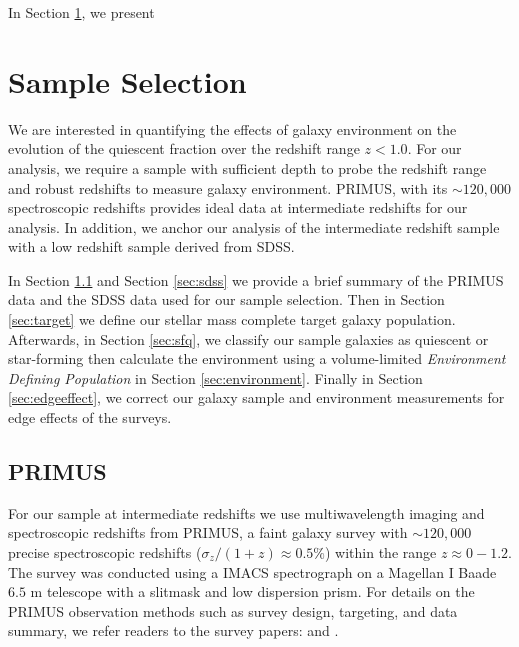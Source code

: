 \documentclass{emulateapj}
\begin{document}
In Section \ref{sec:sample}, we present 

\section{Sample Selection} \label{sec:sample}
We are interested in quantifying the effects of galaxy environment on the evolution of the quiescent fraction over the redshift range $ z < 1.0$. For our analysis, we require a sample with sufficient depth to probe the redshift range and robust redshifts to measure galaxy environment. PRIMUS, with its $\sim 120,000$ spectroscopic redshifts provides ideal data at intermediate redshifts for our analysis. In addition, we anchor our analysis of the intermediate redshift sample with a low redshift sample derived from SDSS. 

In Section \ref{sec:primus} and Section \ref{sec:sdss} we provide a brief summary of the PRIMUS data and the SDSS data used for our sample selection. Then in Section \ref{sec:target} we define our stellar mass complete target galaxy population. Afterwards, in Section \ref{sec:sfq}, we classify our sample galaxies as quiescent or star-forming then calculate the environment using a volume-limited {\em Environment Defining Population} in Section \ref{sec:environment}. 
Finally in Section \ref{sec:edgeeffect}, we correct our galaxy sample and environment measurements for edge effects of the surveys. 

\subsection{PRIMUS} \label{sec:primus}
For our sample at intermediate redshifts we use multiwavelength imaging and spectroscopic redshifts from PRIMUS, a faint galaxy survey with $\sim 120,000$ precise spectroscopic redshifts ($\sigma_z/(1+z) \approx 0.5 \%$) within the range $z \approx 0-1.2$. The survey was conducted using a IMACS spectrograph on a Magellan I Baade $6.5$ m telescope with a slitmask and low dispersion prism. For details on the PRIMUS observation methods such as survey design, targeting, and data summary, we refer readers to the survey papers: \cite{Coil:2011aa} and \cite{Cool:2013aa}. 
\end{document}
